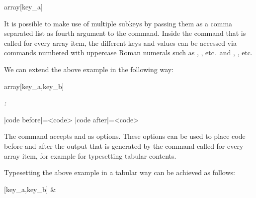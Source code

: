 \documentclass[a4paper]{article}
\begin{document}
{{\begin{codeexamplecolumns}
\begin{itemize}
  \JSONParseArrayMapFunction{\myJSONdata}
    {array}[key_a]{\myJSONitem}
\end{itemize}
\end{codeexamplecolumns}

It is possible to make use of multiple subkeys by passing them as a comma separated list as fourth argument to the command. Inside the command that is called for every array item, the different keys and values can be accessed via commands numbered with uppercase Roman numerals such as \macro{\JSONParseArrayKeyI}, \macro{\JSONParseArrayKeyII}, \macro{\JSONParseArrayKeyIII} etc.\ and \macro{\JSONParseArrayValueI}, \macro{\JSONParseArrayValueII}, \macro{\JSONParseArrayValueIII} etc.

We can extend the above example in the following way:

\begin{codeexamplecolumns}
\newcommand{\myJSONitem}{
  \item \emph{\JSONParseArrayValueI :}
    \JSONParseArrayValueII
}

\begin{itemize}
  \JSONParseArrayMapFunction{\myJSONdata}
    {array}[key_a,key_b]{\myJSONitem}
\end{itemize}
\end{codeexamplecolumns}

\begin{macrodef}
|code before|={<code>}
|code after|={<code>}
\end{macrodef}

The command \macro{\JSONParseArrayMapFunction} accepts  and  as options. These options can be used to place code before and after the output that is generated by the command called for every array item, for example for typesetting tabular contents.

Typesetting the above example in a tabular way can be achieved as follows:

\begin{codeexamplecolumns}
\newcommand{\myJSONitem}{
  \JSONParseArrayValueI &
  \JSONParseArrayValueII \\
}

[key_a,key_b]
  {\myJSONitem}
\end{codeexamplecolumns}

}}
\end{document}
